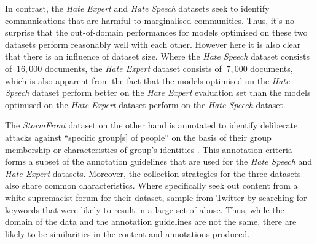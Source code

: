 In contrast, the \textit{Hate Expert} and \textit{Hate Speech} datasets seek to identify communications that are harmful to marginalised communities.
Thus, it's no surprise that the out-of-domain performances for models optimised on these two datasets perform reasonably well with each other.
However here it is also clear that there is an influence of dataset size. 
Where the \textit{Hate Speech} dataset consists of $~16,000$ documents, the \textit{Hate Expert} dataset consists of $~7,000$ documents, which is also apparent from the fact that the models optimised on the \textit{Hate Speech} dataset perform better on the \textit{Hate Expert} evaluation set than the models optimised on the \textit{Hate Expert} dataset perform on the \textit{Hate Speech} dataset.

The \textit{StormFront} dataset on the other hand is annotated to identify deliberate attacks against ``specific group[s] of people'' on the basis of their group membership or characteristics of group's identities \citep{Garcia:2019}.
This annotation criteria forms a subset of the annotation guidelines that are used for the \textit{Hate Speech} and \textit{Hate Expert} datasets.
Moreover, the collection strategies for the three datasets also share common characteristics.
Where \citet{Garcia:2019} specifically seek out content from a white supremacist forum for their dataset, \citet{Waseem:2016,Waseem-Hovy:2016} sample from Twitter by searching for keywords that were likely to result in a large set of abuse. 
Thus, while the domain of the data and the annotation guidelines are not the same, there are likely to be similarities in the content and annotations produced.


